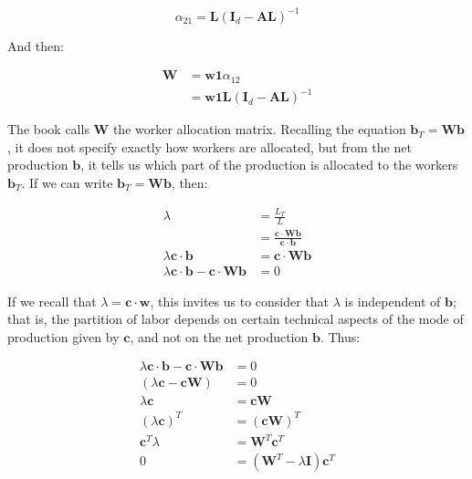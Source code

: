 \begin{equation}
\alpha_{21}=\boldsymbol{L}\left(\boldsymbol{I}_{d}-\boldsymbol{A}\boldsymbol{L}\right)^{-1}
\end{equation}

And then:

\begin{align}
\boldsymbol{W} & =\boldsymbol{w}\boldsymbol{1}\alpha_{12}\\
 & =\boldsymbol{w}\boldsymbol{1}\boldsymbol{L}\left(\boldsymbol{I}_{d}-\boldsymbol{A}\boldsymbol{L}\right)^{-1}
\end{align}

The book calls $\boldsymbol{W}$ the worker allocation matrix. Recalling the equation $\boldsymbol{b}_{T}=\boldsymbol{W}\boldsymbol{b}$, it does not specify exactly how workers are allocated, but from the net production $\boldsymbol{b}$, it tells us which part of the production is allocated to the workers $\boldsymbol{b}_{T}$. If we can write $\boldsymbol{b}_{T}=\boldsymbol{W}\boldsymbol{b}$, then:


\begin{align}
\lambda & =\frac{L_{T}}{L}\\
 & =\frac{\boldsymbol{c\cdot Wb}}{\boldsymbol{c}\cdot\boldsymbol{b}}\\
\lambda\boldsymbol{c}\cdot\boldsymbol{b} & =\boldsymbol{c\cdot Wb}\\
\lambda\boldsymbol{c}\cdot\boldsymbol{b}-\boldsymbol{c\cdot Wb} & =0
\end{align}

If we recall that $\lambda=\boldsymbol{c}\cdot\boldsymbol{w}$, this invites us to consider that $\lambda$ is independent of $\boldsymbol{b}$; that is, the partition of labor depends on certain technical aspects of the mode of production given by $\boldsymbol{c}$, and not on the net production $\boldsymbol{b}$. Thus:


\begin{align}
\lambda\boldsymbol{c}\cdot\boldsymbol{b}-\boldsymbol{c\cdot Wb} & =0\\
\left(\lambda\boldsymbol{c}-\boldsymbol{cW}\right) & =0\\
\lambda\boldsymbol{c} & =\boldsymbol{cW}\\
\left(\lambda\boldsymbol{c}\right)^{T} & =\left(\boldsymbol{cW}\right)^{T}\\
\boldsymbol{c}^{T}\lambda & =\boldsymbol{W}^{T}\boldsymbol{c}^{T}\\
0 & =\left(\boldsymbol{W}^{T}-\lambda\boldsymbol{I}\right)\boldsymbol{c}^{T}
\end{align}

